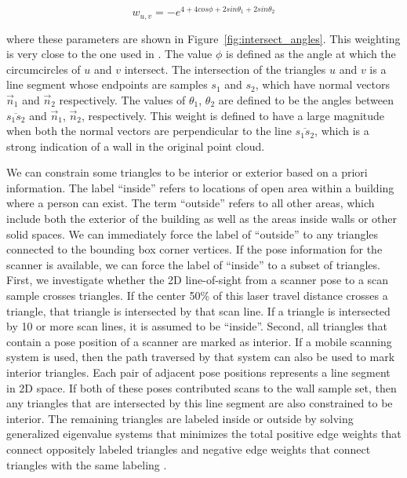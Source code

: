\documentclass[journal]{IEEEtran}
\begin{document}
\begin{equation}
w_{u,v} = - e ^ {4 + 4 cos \phi + 2 sin \theta_1 + 2 sin \theta_2}
\label{neg_edge_weight}
\end{equation}

where these parameters are shown in Figure~\ref{fig:intersect_angles}.  This weighting is very close to the one used in \cite{EigencrustShewchuk}.  The value $\phi$ is defined as the angle at which the circumcircles of $u$ and $v$ intersect.  The intersection of the triangles $u$ and $v$ is a line segment whose endpoints are samples $s_1$ and $s_2$, which have normal vectors $\vec{n}_1$ and $\vec{n}_2$ respectively.  The values of $\theta_1$, $\theta_2$ are defined to be the angles between $\overline{s_1 s_2}$ and $\vec{n}_1$, $\vec{n}_2$, respectively.  This weight is defined to have a large magnitude when both the normal vectors are perpendicular to the line $\overline{s_1 s_2}$, which is a strong indication of a wall in the original point cloud.

We can constrain some triangles to be interior or exterior based on a priori information.  The label ``inside'' refers to locations of open area within a building where a person can exist.  The term ``outside'' refers to all other areas, which include both the exterior of the building as well as the areas inside walls or other solid spaces.  We can immediately force the label of ``outside'' to any triangles connected to the bounding box corner vertices.  If the pose information for the scanner is available, we can force the label of ``inside'' to a subset of triangles.  First, we investigate whether the 2D line-of-sight from a scanner pose to a scan sample crosses triangles.  If the center 50\% of this laser travel distance crosses a triangle, that triangle is intersected by that scan line.  If a triangle is intersected by 10 or more scan lines, it is assumed to be ``inside''.  Second, all triangles that contain a pose position of a scanner are marked as interior.  If a mobile scanning system is used, then the path traversed by that system can also be used to mark interior triangles.  Each pair of adjacent pose positions represents a line segment in 2D space.  If both of these poses contributed scans to the wall sample set, then any triangles that are intersected by this line segment are also constrained to be interior.  The remaining triangles are labeled inside or outside by solving generalized eigenvalue systems that minimizes the total positive edge weights that connect oppositely labeled triangles and negative edge weights that connect triangles with the same labeling \cite{EigencrustShewchuk}.
\end{document}
